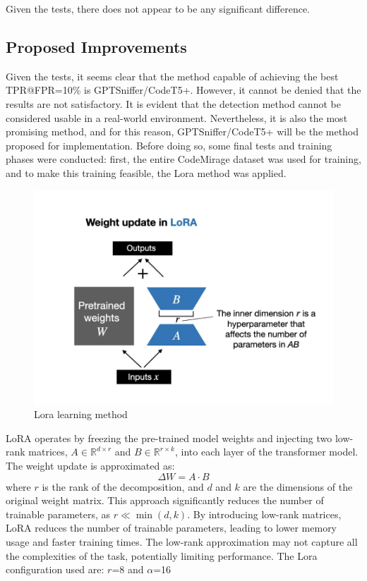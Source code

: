 Given the tests, there does not appear to be any significant difference.





\clearpage
\subsection{Proposed Improvements}
Given the tests, it seems clear that the method capable of achieving 
the best TPR@FPR=10\% is GPTSniffer/CodeT5+. However, it cannot be denied 
that the results are not satisfactory. It is evident that the detection 
method cannot be considered usable in a real-world environment. Nevertheless, 
it is also the most promising method, and for this reason, GPTSniffer/CodeT5+ 
will be the method proposed for implementation. Before doing so, some final 
tests and training phases were conducted: first, the entire CodeMirage 
dataset was used for training, and to make this training feasible, the 
Lora method was applied.


\begin{figure}[H]
    \centering
    \includegraphics[width=0.5\linewidth]{img/Lora.png}
    \caption{Lora learning method}
    \label{fig:Lora}
\end{figure}
LoRA operates by freezing the pre-trained model weights and injecting 
two low-rank matrices, \( A \in \mathbb{R}^{d \times r} \) and 
\( B \in \mathbb{R}^{r \times k} \), into each layer of the 
transformer model. The weight update is approximated as:
\[
\Delta W = A \cdot B
\]
where \( r \) is the rank of the decomposition, and \( d \) 
and \( k \) are the dimensions of the original weight matrix. 
This approach significantly reduces the number of trainable parameters, 
as \( r \ll \min(d, k) \).
By introducing low-rank matrices, LoRA reduces the number of trainable 
parameters, leading to lower memory usage and faster training times.
The low-rank approximation may not capture all the complexities of the task, 
potentially limiting performance.
The Lora configuration used are: $r$=8 and $\alpha$=16



